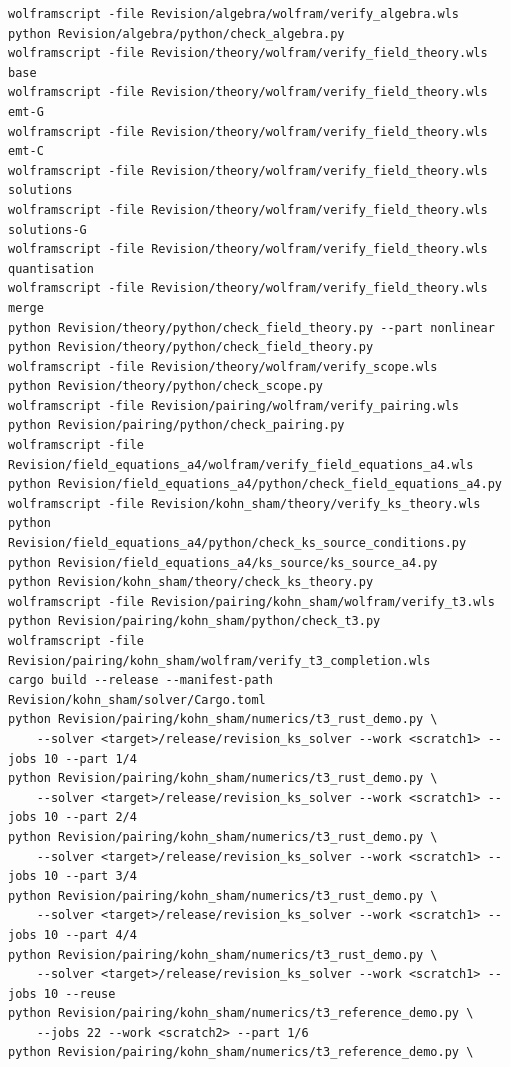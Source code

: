 \documentclass[11pt]{article}
\begin{document}
\begin{Verbatim}[fontsize=\small]
wolframscript -file Revision/algebra/wolfram/verify_algebra.wls
python Revision/algebra/python/check_algebra.py
wolframscript -file Revision/theory/wolfram/verify_field_theory.wls base
wolframscript -file Revision/theory/wolfram/verify_field_theory.wls emt-G
wolframscript -file Revision/theory/wolfram/verify_field_theory.wls emt-C
wolframscript -file Revision/theory/wolfram/verify_field_theory.wls solutions
wolframscript -file Revision/theory/wolfram/verify_field_theory.wls solutions-G
wolframscript -file Revision/theory/wolfram/verify_field_theory.wls quantisation
wolframscript -file Revision/theory/wolfram/verify_field_theory.wls merge
python Revision/theory/python/check_field_theory.py --part nonlinear
python Revision/theory/python/check_field_theory.py
wolframscript -file Revision/theory/wolfram/verify_scope.wls
python Revision/theory/python/check_scope.py
wolframscript -file Revision/pairing/wolfram/verify_pairing.wls
python Revision/pairing/python/check_pairing.py
wolframscript -file Revision/field_equations_a4/wolfram/verify_field_equations_a4.wls
python Revision/field_equations_a4/python/check_field_equations_a4.py
wolframscript -file Revision/kohn_sham/theory/verify_ks_theory.wls
python Revision/field_equations_a4/python/check_ks_source_conditions.py
python Revision/field_equations_a4/ks_source/ks_source_a4.py
python Revision/kohn_sham/theory/check_ks_theory.py
wolframscript -file Revision/pairing/kohn_sham/wolfram/verify_t3.wls
python Revision/pairing/kohn_sham/python/check_t3.py
wolframscript -file Revision/pairing/kohn_sham/wolfram/verify_t3_completion.wls
cargo build --release --manifest-path Revision/kohn_sham/solver/Cargo.toml
python Revision/pairing/kohn_sham/numerics/t3_rust_demo.py \
    --solver <target>/release/revision_ks_solver --work <scratch1> --jobs 10 --part 1/4
python Revision/pairing/kohn_sham/numerics/t3_rust_demo.py \
    --solver <target>/release/revision_ks_solver --work <scratch1> --jobs 10 --part 2/4
python Revision/pairing/kohn_sham/numerics/t3_rust_demo.py \
    --solver <target>/release/revision_ks_solver --work <scratch1> --jobs 10 --part 3/4
python Revision/pairing/kohn_sham/numerics/t3_rust_demo.py \
    --solver <target>/release/revision_ks_solver --work <scratch1> --jobs 10 --part 4/4
python Revision/pairing/kohn_sham/numerics/t3_rust_demo.py \
    --solver <target>/release/revision_ks_solver --work <scratch1> --jobs 10 --reuse
python Revision/pairing/kohn_sham/numerics/t3_reference_demo.py \
    --jobs 22 --work <scratch2> --part 1/6
python Revision/pairing/kohn_sham/numerics/t3_reference_demo.py \

\end{Verbatim}
\end{document}
